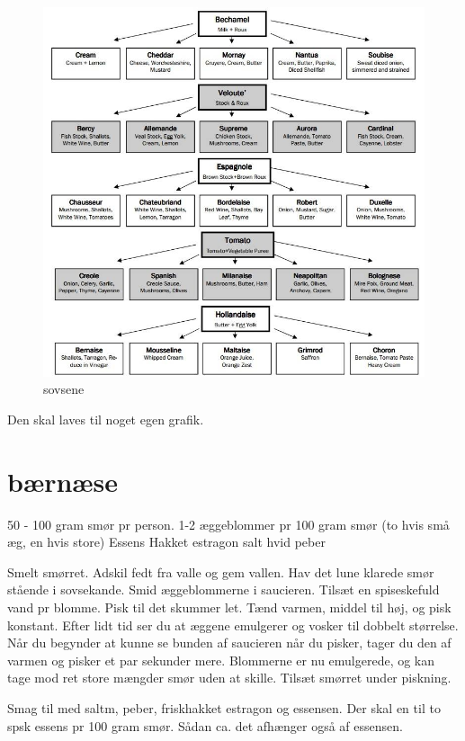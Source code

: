 \documentclass[
]{book}
\begin{document}
\begin{figure}
\centering
\includegraphics{images/saucer.jpg}
\caption{sovsene}
\end{figure}

Den skal laves til noget egen grafik.

\hypertarget{buxe6rnuxe6se}{%
\section{bærnæse}\label{buxe6rnuxe6se}}

50 - 100 gram smør pr person.
1-2 æggeblommer pr 100 gram smør (to hvis små æg, en hvis store)
Essens
Hakket estragon
salt
hvid peber

Smelt smørret. Adskil fedt fra valle og gem vallen.
Hav det lune klarede smør stående i sovsekande.
Smid æggeblommerne i saucieren. Tilsæt en spiseskefuld vand pr blomme.
Pisk til det skummer let.
Tænd varmen, middel til høj, og pisk konstant.
Efter lidt tid ser du at æggene emulgerer og vosker til dobbelt størrelse.
Når du begynder at kunne se bunden af saucieren når du pisker, tager du
den af varmen og pisker et par sekunder mere.
Blommerne er nu emulgerede, og kan tage mod ret store mængder smør uden
at skille. Tilsæt smørret under piskning.

Smag til med saltm, peber, friskhakket estragon og essensen. Der skal en til
to spsk essens pr 100 gram smør. Sådan ca. det afhænger også af essensen.
\end{document}
